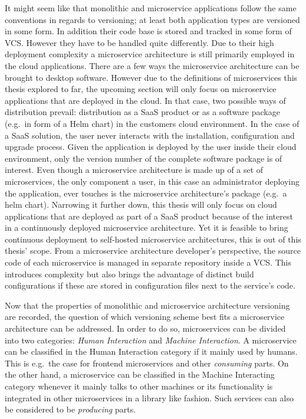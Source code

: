 It might seem like that monolithic and microservice applications
follow the same conventions in regards to versioning; at least both application
types are versioned in some form. In addition their code base is stored and
tracked in some form of \ac{VCS}. However they have to be handled quite
differently. Due to their high deployment complexity a microservice
architecture is still primarily employed in the cloud applications. There are a
few ways the microservice architecture can be brought to desktop software.
However due to the definitions of microservices this thesis explored to far,
the upcoming section will only focus on microservice applications that are
deployed in the cloud. In that case, two possible ways of distribution prevail:
distribution as a \ac{SaaS} product or as a software package (e.g.\ in form of
a Helm chart) in the customers cloud environment. In the case of a \ac{SaaS}
solution, the user never interacts with the installation, configuration and
upgrade process. Given the application is deployed by the user inside their
cloud environment, only the version number of the complete software package is
of interest. Even though a microservice architecture is made up of a set of
microservices, the only component a user, in this case an administrator
deploying the application, ever touches is the microservice architecture's
package (e.g.\ a helm chart). Narrowing it further down, this thesis will only
focus on cloud applications that are deployed as part of a \ac{SaaS} product
because of the interest in a continuously deployed microservice architecture.
Yet it is feasible to bring continuous deployment to self-hosted microservice
architectures, this is out of this thesis' scope. From a microservice
architecture developer's perspective, the source code of each microservice is
managed in separate repository inside a \ac{VCS}. This introduces complexity
but also brings the advantage of distinct build configurations if these are
stored in configuration files next to the service's code.

Now that the properties of monolithic and microservice architecture versioning
are recorded, the question of which versioning scheme best fits a microservice
architecture can be addressed. In order to do so, microservices can be divided
into two categories: \textit{Human Interaction} and \textit{Machine
Interaction}. A microservice can be classified in the Human Interaction
category if it mainly used by humans. This is e.g.\ the case for frontend
microservices and other \textit{consuming} parts. On the other hand, a
microservice can be classified in the Machine Interacting category whenever it
mainly talks to other machines or its functionality is integrated in other
microservices in a library like fashion. Such services can also be considered
to be \textit{producing} parts.

